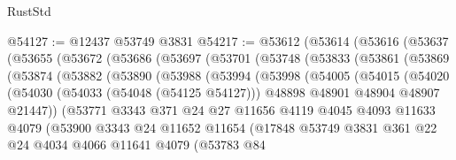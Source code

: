 \begin{lexlean}{RustStd}
\begin{coremodule}
@54127 := @12437 @53749 @3831
@54217 := @53612
    (@53614
      (@53616
        (@53637
          (@53655
            (@53672
              (@53686
                (@53697
                  (@53701
                    (@53748
                      (@53833
                        (@53861
                          (@53869
                            (@53874
                              (@53882
                                (@53890
                                  (@53988
                                    (@53994
                                      (@53998
                                        (@54005
                                          (@54015
                                            (@54020
                                              (@54030
                                                (@54033 (@54048 (@54125 @54127)))
                                                @48898
                                                @48901
                                                @48904
                                                @48907
                                                @21447))
                                            (@53771
                                              @3343
                                              @371
                                              @24
                                              @27
                                              @11656
                                              @4119
                                              @4045
                                              @4093
                                              @11633
                                              @4079
                                              (@53900
                                                @3343
                                                @24
                                                @11652
                                                @11654
                                                (@17848
                                                  @53749
                                                  @3831
                                                  @361
                                                  @22
                                                  @24
                                                  @4034
                                                  @4066
                                                  @11641
                                                  @4079
                                                  (@53783
                                                    @84

\end{coremodule}
\end{lexlean}
